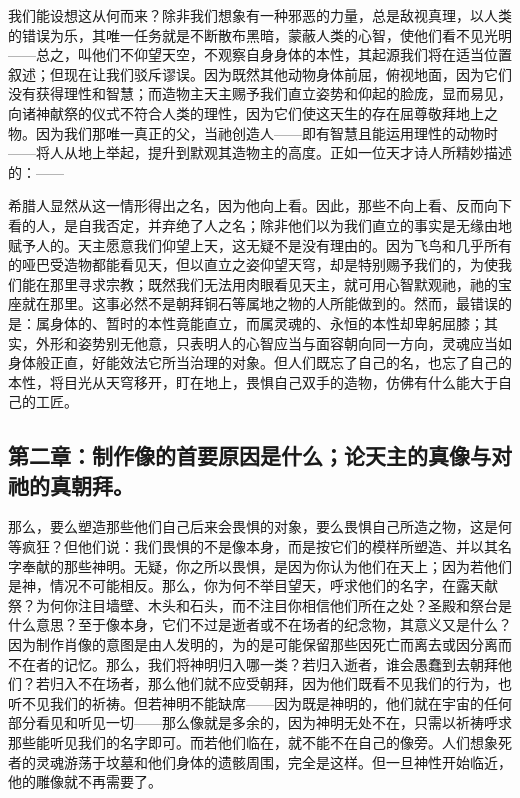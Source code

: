 我们能设想这从何而来？除非我们想象有一种邪恶的力量，总是敌视真理，以人类的错误为乐，其唯一任务就是不断散布黑暗，蒙蔽人类的心智，使他们看不见光明——总之，叫他们不仰望天空，不观察自身身体的本性，其起源我们将在适当位置叙述；但现在让我们驳斥谬误。因为既然其他动物身体前屈，俯视地面，因为它们没有获得理性和智慧；而造物主天主赐予我们直立姿势和仰起的脸庞，显而易见，向诸神献祭的仪式不符合人类的理性，因为它们使这天生的存在屈尊敬拜地上之物。因为我们那唯一真正的父，当祂创造人——即有智慧且能运用理性的动物时——将人从地上举起，提升到默观其造物主的高度。正如一位天才诗人所精妙描述的：——\par

\par

希腊人显然从这一情形得出之名，因为他向上看。因此，那些不向上看、反而向下看的人，是自我否定，并弃绝了人之名；除非他们以为我们直立的事实是无缘由地赋予人的。天主愿意我们仰望上天，这无疑不是没有理由的。因为飞鸟和几乎所有的哑巴受造物都能看见天，但以直立之姿仰望天穹，却是特别赐予我们的，为使我们能在那里寻求宗教；既然我们无法用肉眼看见天主，就可用心智默观祂，祂的宝座就在那里。这事必然不是朝拜铜石等属地之物的人所能做到的。然而，最错误的是：属身体的、暂时的本性竟能直立，而属灵魂的、永恒的本性却卑躬屈膝；其实，外形和姿势别无他意，只表明人的心智应当与面容朝向同一方向，灵魂应当如身体般正直，好能效法它所当治理的对象。但人们既忘了自己的名，也忘了自己的本性，将目光从天穹移开，盯在地上，畏惧自己双手的造物，仿佛有什么能大于自己的工匠。\par


\subsection{第二章：制作像的首要原因是什么；论天主的真像与对祂的真朝拜。}

那么，要么塑造那些他们自己后来会畏惧的对象，要么畏惧自己所造之物，这是何等疯狂？但他们说：我们畏惧的不是像本身，而是按它们的模样所塑造、并以其名字奉献的那些神明。无疑，你之所以畏惧，是因为你认为他们在天上；因为若他们是神，情况不可能相反。那么，你为何不举目望天，呼求他们的名字，在露天献祭？为何你注目墙壁、木头和石头，而不注目你相信他们所在之处？圣殿和祭台是什么意思？至于像本身，它们不过是逝者或不在场者的纪念物，其意义又是什么？因为制作肖像的意图是由人发明的，为的是可能保留那些因死亡而离去或因分离而不在者的记忆。那么，我们将神明归入哪一类？若归入逝者，谁会愚蠢到去朝拜他们？若归入不在场者，那么他们就不应受朝拜，因为他们既看不见我们的行为，也听不见我们的祈祷。但若神明不能缺席——因为既是神明的，他们就在宇宙的任何部分看见和听见一切——那么像就是多余的，因为神明无处不在，只需以祈祷呼求那些能听见我们的名字即可。而若他们临在，就不能不在自己的像旁。人们想象死者的灵魂游荡于坟墓和他们身体的遗骸周围，完全是这样。但一旦神性开始临近，他的雕像就不再需要了。\par

